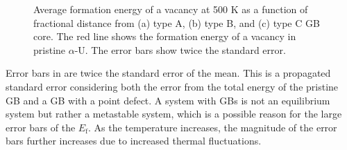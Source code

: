 \documentclass[review]{elsarticle}
\begin{document}
\begin{figure}[h!]
\centering
{} 
\caption{Average formation energy of a vacancy at 500 K as a function of fractional distance from (a) type A, (b) type B, and (c) type C GB core. The red line shows the formation energy of a vacancy in pristine $\alpha$-U. The error bars show twice the standard error.}
\label{fig:Seg_vacancy_500}
\end{figure}

\par Error bars in  are twice the standard error of the mean. This is a propagated standard error considering both the error from the total energy of the pristine GB and a GB with a point defect. A system with GBs is not an equilibrium system but rather a metastable system, which is a possible reason for the large error bars of the $E_{\mathrm{f}}$. As the temperature increases, the magnitude of the error bars further increases due to increased thermal fluctuations.
\end{document}
